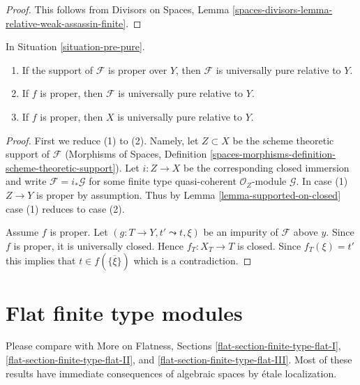 \begin{proof}
This follows from Divisors on Spaces, Lemma
\ref{spaces-divisors-lemma-relative-weak-assassin-finite}.
\end{proof}

\begin{lemma}
\label{lemma-proper-pure}
In Situation \ref{situation-pre-pure}.
\begin{enumerate}
\item If the support of $\mathcal{F}$ is proper over $Y$, then
$\mathcal{F}$ is universally pure relative to $Y$.
\item If $f$ is proper, then
$\mathcal{F}$ is universally pure relative to $Y$.
\item If $f$ is proper, then $X$ is universally pure relative to $Y$.
\end{enumerate}
\end{lemma}

\begin{proof}
First we reduce (1) to (2). Namely, let $Z \subset X$ be the
scheme theoretic support of $\mathcal{F}$
(Morphisms of Spaces, Definition
\ref{spaces-morphisms-definition-scheme-theoretic-support}). Let $i : Z \to X$
be the corresponding closed immersion and write
$\mathcal{F} = i_*\mathcal{G}$ for some finite type quasi-coherent
$\mathcal{O}_Z$-module $\mathcal{G}$.
In case (1) $Z \to Y$ is proper by assumption.
Thus by Lemma \ref{lemma-supported-on-closed} case (1) reduces to case (2).

\medskip\noindent
Assume $f$ is proper.
Let $(g : T \to Y, t' \leadsto t, \xi)$ be an impurity of $\mathcal{F}$
above $y$. Since $f$ is proper, it is universally closed. Hence
$f_T : X_T \to T$ is closed. Since $f_T(\xi) = t'$ this implies that
$t \in f(\overline{\{\xi\}})$ which is a contradiction.
\end{proof}







\section{Flat finite type modules}
\label{section-finite-type-flat}

\noindent
Please compare with
More on Flatness, Sections
\ref{flat-section-finite-type-flat-I},
\ref{flat-section-finite-type-flat-II}, and
\ref{flat-section-finite-type-flat-III}.
Most of these results have immediate consequences
of algebraic spaces by \'etale localization.

